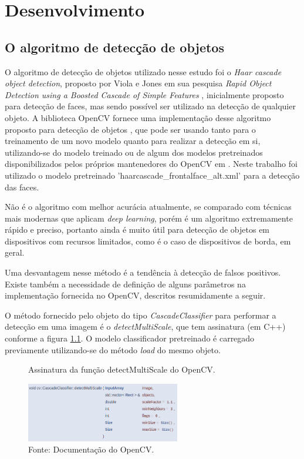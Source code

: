 \chapter{Desenvolvimento}
\thispagestyle{plain}
\label{cap:desenvolvimento}
\graphicspath{{./Cap3_Desenvolvimento/Figures/}}

\section{O algoritmo de detecção de objetos}

O algoritmo de detecção de objetos utilizado nesse estudo foi o \textit{Haar cascade object detection}, proposto por Viola e Jones em sua pesquisa \textit{Rapid Object Detection using a Boosted Cascade of Simple Features} \cite{Viola2001}, inicialmente proposto para detecção de faces, mas sendo possível ser utilizado na detecção de qualquier objeto. A biblioteca OpenCV fornece uma implementação desse algoritmo proposto para detecção de objetos \cite{OpenCV-CascadeClassifier}, que pode ser usando tanto para o treinamento de um novo modelo quanto para realizar a detecção em si, utilizando-se do modelo treinado ou de algum dos modelos pretreinados disponibilizados pelos próprios mantenedores do OpenCV em \cite{OpenCV-PreTrainedModels}. Neste trabalho foi utilizado o modelo pretreinado 'haarcascade\_frontalface\_alt.xml' para a detecção das faces. 

Não é o algoritmo com melhor acurácia atualmente, se comparado com técnicas mais modernas que aplicam \textit{deep learning}, porém é um algoritmo extremamente rápido e preciso, portanto ainda é muito útil para detecção de objetos em dispositivos com recursos limitados, como é o caso de dispositivos de borda, em geral.

Uma desvantagem nesse método é a tendência à detecção de falsos positivos. Existe também a necessidade de definição de alguns parâmetros na implementação fornecida no OpenCV, descritos resumidamente a seguir.

O método fornecido pelo objeto do tipo \emph{CascadeClassifier} \cite{OpenCV-CascadeClassifier} para performar a detecção em uma imagem é o \emph{detectMultiScale}, que tem assinatura (em C++) conforme a figura \ref{fig:detectMultiScaleFcn}. O modelo classificador pretreinado é carregado previamente utilizando-se do método \emph{load} do mesmo objeto.

\begin{figure}[h]
    \centering
    \caption[Assinatura da função detectMultiScale do OpenCV.]{Assinatura da função detectMultiScale do OpenCV.}
    \includegraphics[width=0.60\textwidth]{Cap3_Desenvolvimento/Figures/detectMultiScaleFcn.jpg}
    \caption*{Fonte: Documentação do OpenCV.\footnotemark}
    \label{fig:detectMultiScaleFcn}
\end{figure}

